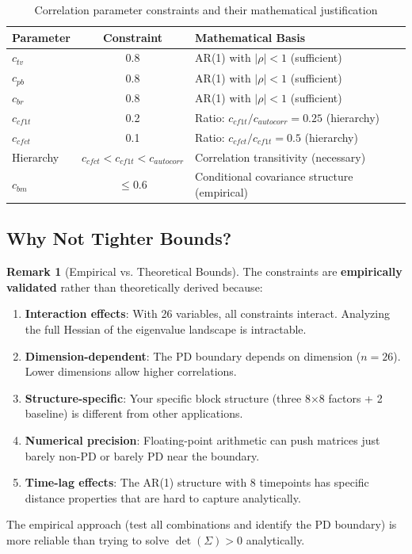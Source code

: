 \documentclass[12pt,a4paper]{article}
\theoremstyle{definition}
\newtheorem{remark}{Remark}
\begin{document}
\begin{table}[h]
\centering
\begin{tabular}{|l|c|l|}
\hline
\textbf{Parameter} & \textbf{Constraint} & \textbf{Mathematical Basis} \\
\hline
$c_{tv}$ & 0.8 & AR(1) with $|\rho| < 1$ (sufficient) \\
$c_{pb}$ & 0.8 & AR(1) with $|\rho| < 1$ (sufficient) \\
$c_{br}$ & 0.8 & AR(1) with $|\rho| < 1$ (sufficient) \\
\hline
$c_{cf1t}$ & 0.2 & Ratio: $c_{cf1t} / c_{autocorr} = 0.25$ (hierarchy) \\
$c_{cfct}$ & 0.1 & Ratio: $c_{cfct} / c_{cf1t} = 0.5$ (hierarchy) \\
\hline
Hierarchy & $c_{cfct} < c_{cf1t} < c_{autocorr}$ & Correlation transitivity (necessary) \\
\hline
$c_{bm}$ & $\leq 0.6$ & Conditional covariance structure (empirical) \\
\hline
\end{tabular}
\caption{Correlation parameter constraints and their mathematical justification}
\end{table}

\subsection{Why Not Tighter Bounds?}

\begin{remark}[Empirical vs. Theoretical Bounds]
The constraints are \textbf{empirically validated} rather than theoretically derived because:

\begin{enumerate}
  \item \textbf{Interaction effects}: With 26 variables, all constraints interact. Analyzing the full Hessian of the eigenvalue landscape is intractable.

  \item \textbf{Dimension-dependent}: The PD boundary depends on dimension ($n=26$). Lower dimensions allow higher correlations.

  \item \textbf{Structure-specific}: Your specific block structure (three 8×8 factors + 2 baseline) is different from other applications.

  \item \textbf{Numerical precision}: Floating-point arithmetic can push matrices just barely non-PD or barely PD near the boundary.

  \item \textbf{Time-lag effects}: The AR(1) structure with 8 timepoints has specific distance properties that are hard to capture analytically.
\end{enumerate}

The empirical approach (test all combinations and identify the PD boundary) is more reliable than trying to solve $\det(\Sigma) > 0$ analytically.
\end{remark}
\end{document}
